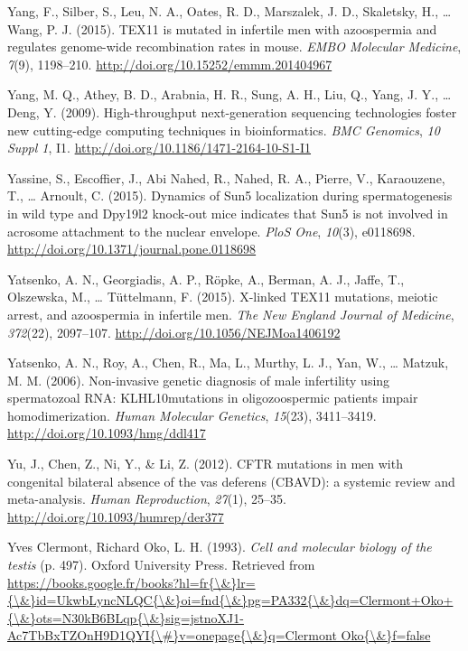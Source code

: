 \documentclass[12pt,twoside]{reedthesis}
\theoremstyle{definition}
\theoremstyle{definition}
\theoremstyle{remark}
\begin{document}
  \hypertarget{ref-Yang2015}{}
  Yang, F., Silber, S., Leu, N. A., Oates, R. D., Marszalek, J. D.,
  Skaletsky, H., \ldots{} Wang, P. J. (2015). TEX11 is mutated in
  infertile men with azoospermia and regulates genome-wide recombination
  rates in mouse. \emph{EMBO Molecular Medicine}, \emph{7}(9), 1198--210.
  \url{http://doi.org/10.15252/emmm.201404967}
  
  \hypertarget{ref-Yang2009}{}
  Yang, M. Q., Athey, B. D., Arabnia, H. R., Sung, A. H., Liu, Q., Yang,
  J. Y., \ldots{} Deng, Y. (2009). High-throughput next-generation
  sequencing technologies foster new cutting-edge computing techniques in
  bioinformatics. \emph{BMC Genomics}, \emph{10 Suppl 1}, I1.
  \url{http://doi.org/10.1186/1471-2164-10-S1-I1}
  
  \hypertarget{ref-Yassine2015}{}
  Yassine, S., Escoffier, J., Abi Nahed, R., Nahed, R. A., Pierre, V.,
  Karaouzene, T., \ldots{} Arnoult, C. (2015). Dynamics of Sun5
  localization during spermatogenesis in wild type and Dpy19l2 knock-out
  mice indicates that Sun5 is not involved in acrosome attachment to the
  nuclear envelope. \emph{PloS One}, \emph{10}(3), e0118698.
  \url{http://doi.org/10.1371/journal.pone.0118698}
  
  \hypertarget{ref-Yatsenko2015}{}
  Yatsenko, A. N., Georgiadis, A. P., Röpke, A., Berman, A. J., Jaffe, T.,
  Olszewska, M., \ldots{} Tüttelmann, F. (2015). X-linked TEX11 mutations,
  meiotic arrest, and azoospermia in infertile men. \emph{The New England
  Journal of Medicine}, \emph{372}(22), 2097--107.
  \url{http://doi.org/10.1056/NEJMoa1406192}
  
  \hypertarget{ref-Yatsenko2006}{}
  Yatsenko, A. N., Roy, A., Chen, R., Ma, L., Murthy, L. J., Yan, W.,
  \ldots{} Matzuk, M. M. (2006). Non-invasive genetic diagnosis of male
  infertility using spermatozoal RNA: KLHL10mutations in oligozoospermic
  patients impair homodimerization. \emph{Human Molecular Genetics},
  \emph{15}(23), 3411--3419. \url{http://doi.org/10.1093/hmg/ddl417}
  
  \hypertarget{ref-Yu2012}{}
  Yu, J., Chen, Z., Ni, Y., \& Li, Z. (2012). CFTR mutations in men with
  congenital bilateral absence of the vas deferens (CBAVD): a systemic
  review and meta-analysis. \emph{Human Reproduction}, \emph{27}(1),
  25--35. \url{http://doi.org/10.1093/humrep/der377}
  
  \hypertarget{ref-YvesClermontRichardOko1993}{}
  Yves Clermont, Richard Oko, L. H. (1993). \emph{Cell and molecular
  biology of the testis} (p. 497). Oxford University Press. Retrieved from
  \href{https://books.google.fr/books?hl=fr\%7B/\&\%7Dlr=\%7B/\&\%7Did=UkwbLyncNLQC\%7B/\&\%7Doi=fnd\%7B/\&\%7Dpg=PA332\%7B/\&\%7Ddq=Clermont+Oko+\%7B/\&\%7Dots=N30kB6BLqp\%7B/\&\%7Dsig=jstnoXJ1-Ac7TbBxTZOnH9D1QYI\%7B/\#\%7Dv=onepage\%7B/\&\%7Dq=Clermont\%20Oko\%7B/\&\%7Df=false}{https://books.google.fr/books?hl=fr\{\textbackslash{}\&\}lr=\{\textbackslash{}\&\}id=UkwbLyncNLQC\{\textbackslash{}\&\}oi=fnd\{\textbackslash{}\&\}pg=PA332\{\textbackslash{}\&\}dq=Clermont+Oko+\{\textbackslash{}\&\}ots=N30kB6BLqp\{\textbackslash{}\&\}sig=jstnoXJ1-Ac7TbBxTZOnH9D1QYI\{\textbackslash{}\#\}v=onepage\{\textbackslash{}\&\}q=Clermont Oko\{\textbackslash{}\&\}f=false}
  
\end{document}
